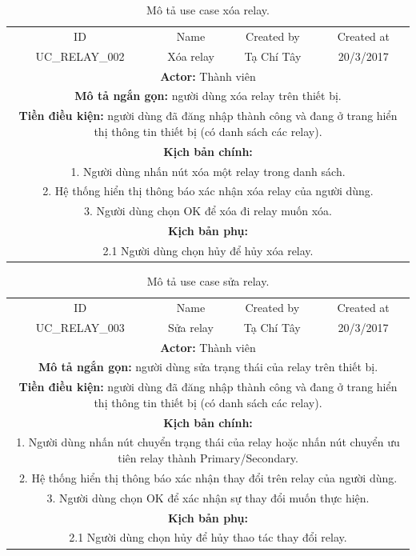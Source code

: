 \documentclass[a4paper,12pt,oneside]{article}
\begin{document}
\begin{table}[!htp]
\centering
\begin{tabularx}{\linewidth}{ |c||c|c|c| }
\hline
ID & Name & Created by & Created at\\
UC\_RELAY\_002 & Xóa relay & Tạ Chí Tây & 20/3/2017\\
\hline
\multicolumn{4}{|X|}{\textbf{Actor:} Thành viên }\\
\hline
\multicolumn{4}{|X|}{\textbf{Mô tả ngắn gọn:} người dùng xóa relay trên thiết bị.}\\
\hline
\multicolumn{4}{|X|}{\textbf{Tiền điều kiện:} người dùng đã đăng nhập thành công và đang ở trang hiển thị thông tin thiết bị (có danh sách các relay).}\\
\hline
\multicolumn{4}{|X|}{\textbf{Kịch bản chính:}}\\
\multicolumn{4}{|X|}{1. Người dùng nhấn nút xóa một relay trong danh sách.}\\
\multicolumn{4}{|X|}{
2.	 Hệ thống hiển thị thông báo xác nhận xóa relay của người dùng.}\\
\multicolumn{4}{|X|}{
3.	Người dùng chọn OK để xóa đi relay muốn xóa.}\\
\hline
\multicolumn{4}{|X|}{\textbf{Kịch bản phụ:}}\\
\multicolumn{4}{|X|}{2.1    Người dùng chọn hủy để hủy xóa relay.}\\
\hline
\end{tabularx}
\caption{Mô tả use case xóa relay.}
\end{table}

\begin{table}[!htp]
\centering
\begin{tabularx}{\linewidth}{ |c||c|c|c| }
\hline
ID & Name & Created by & Created at\\
UC\_RELAY\_003 & Sửa relay & Tạ Chí Tây & 20/3/2017\\
\hline
\multicolumn{4}{|X|}{\textbf{Actor:} Thành viên }\\
\hline
\multicolumn{4}{|X|}{\textbf{Mô tả ngắn gọn:} người dùng sửa trạng thái của relay trên thiết bị.}\\
\hline
\multicolumn{4}{|X|}{\textbf{Tiền điều kiện:} người dùng đã đăng nhập thành công và đang ở trang hiển thị thông tin thiết bị (có danh sách các relay).}\\
\hline
\multicolumn{4}{|X|}{\textbf{Kịch bản chính:}}\\
\multicolumn{4}{|X|}{1. Người dùng nhấn nút chuyển trạng thái của relay hoặc nhấn nút chuyển ưu tiên relay thành Primary/Secondary.}\\
\multicolumn{4}{|X|}{
2.	 Hệ thống hiển thị thông báo xác nhận thay đổi trên relay của người dùng.}\\
\multicolumn{4}{|X|}{
3.	Người dùng chọn OK để xác nhận sự thay đổi muốn thực hiện.}\\
\hline
\multicolumn{4}{|X|}{\textbf{Kịch bản phụ:}}\\
\multicolumn{4}{|X|}{2.1    Người dùng chọn hủy để hủy thao tác thay đổi relay.}\\
\hline
\end{tabularx}
\caption{Mô tả use case sửa relay.}
\end{table}
\end{document}
